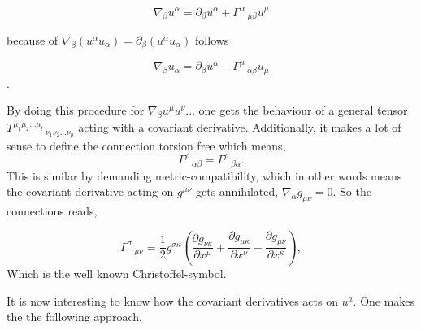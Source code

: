 \documentclass[12pt,a4paper]{article}
\begin{document}
	\begin{equation}
		\label{covariant}
		\nabla_\beta u^\alpha = \partial_\beta u^\alpha  +   \Gamma^\alpha\,_{\mu \beta} u^\mu
	\end{equation}
	
	because of $\nabla_\beta \left(u^\alpha u_\alpha\right) = \partial_\beta \left(u^\alpha u_\alpha \right)$ 
	follows
	
	$$\nabla_\beta u_\alpha = \partial_\beta u^\alpha  -   \Gamma^\mu\,_{\alpha \beta} u_\mu$$.
	
	By doing this procedure for $\nabla_\beta u^\mu u^\nu \ldots$ one gets the behaviour  of a general tensor  $T^{\mu_1 \mu_2 \ldots \mu_l}\,_{\nu_1 \nu_2 \ldots \nu_p}$ acting with a covariant derivative. Additionally, it makes a lot of sense to define the connection torsion free which means,
	$$
	\Gamma^\rho\,_{\alpha \beta} = \Gamma^\rho\,_{\beta \alpha}.
	$$
	This is similar by demanding metric-compatibility, which in other words means the covariant derivative acting on $g^{\mu \nu}$ gets annihilated, $\nabla_\alpha g_{\mu \nu} = 0$. So the connections reads,
	
	
	\begin{equation}
		\label{christoffelconnection}
		\Gamma^{\sigma }\, _{{\mu }{\nu }}={\frac {1}{2}}g^{{\sigma }{\kappa }}\left({\frac {\partial g_{{\nu }{\kappa }}}{\partial x^{\mu }}}+{\frac {\partial g_{{\mu }{\kappa }}}{\partial x^{\nu }}}-{\frac {\partial g_{{\mu }{\nu }}}{\partial x^{\kappa }}}\right),
	\end{equation}
	Which is the well known Christoffel-symbol.
	
	It is now interesting to know how the covariant derivatives acts on $u^a$. One makes the the following approach,
	
\end{document}
